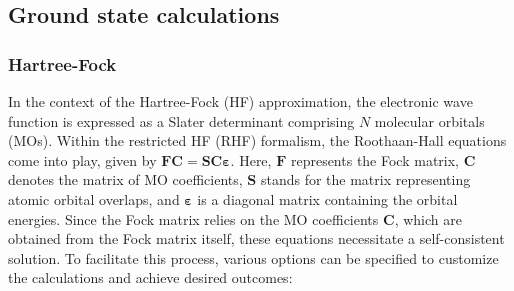 \documentclass[aip,jcp,reprint,noshowkeys,superscriptaddress]{revtex4-1}
\newcommand{\FkMat}{\bm{F}}
\newcommand{\FMat}{\bm{F}}
\newcommand{\SMat}{\bm{S}}
\newcommand{\CMat}{\bm{C}}
\newcommand{\MOevMat}{\bm{\varepsilon}}
\begin{document}
\subsection{Ground state calculations}

\subsubsection*{Hartree-Fock}
In the context of the Hartree-Fock (HF) approximation, the electronic wave function is expressed as a Slater determinant comprising $N$ molecular orbitals (MOs). Within the restricted HF (RHF) formalism, the Roothaan-Hall equations come into play, given by $\FkMat \CMat = \SMat \CMat \MOevMat$. Here, $\FMat$ represents the Fock matrix, $\CMat$ denotes the matrix of MO coefficients, $\SMat$ stands for the matrix representing atomic orbital overlaps, and $\MOevMat$ is a diagonal matrix containing the orbital energies.
Since the Fock matrix relies on the MO coefficients $\CMat$, which are obtained from the Fock matrix itself, these equations necessitate a self-consistent solution. To facilitate this process, various options can be specified to customize the calculations and achieve desired outcomes: 
\end{document}
